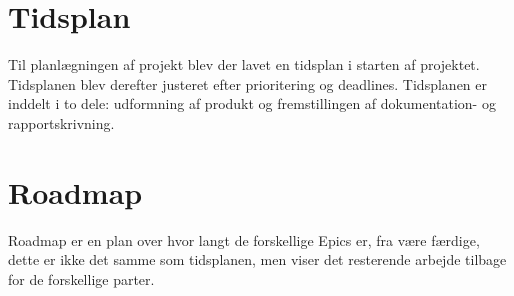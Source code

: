 \section{Tidsplan}

Til planlægningen af projekt blev der lavet en tidsplan i starten af projektet. Tidsplanen blev derefter justeret efter prioritering og deadlines. Tidsplanen er inddelt i to dele: udformning af produkt og fremstillingen af dokumentation- og rapportskrivning.


\section{Roadmap}

Roadmap er en plan over hvor langt de forskellige Epics er, fra være færdige, dette er ikke det samme som tidsplanen, men viser det resterende arbejde tilbage for de forskellige parter.

